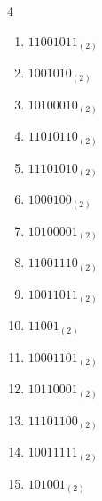 \begin{multicols}{4}
\begin{enumerate}
        \phantom{$=18$}

  \item $11001011_{(2)}$

        \phantom{$=203$}

\columnbreak %

  \item $1001010_{(2)}$

        \phantom{$=74$}

  \item $10100010_{(2)}$

        \phantom{$=162$}

  \item $11010110_{(2)}$

        \phantom{$=214$}

  \item $11101010_{(2)}$

        \phantom{$=234$}

  \item $1000100_{(2)}$

        \phantom{$=68$}

  \item $10100001_{(2)}$

        \phantom{$=161$}

  \item $11001110_{(2)}$

        \phantom{$=206$}

  \item $10011011_{(2)}$

        \phantom{$=155$}

  \item $11001_{(2)}$

        \phantom{$=25$}

  \item $10001101_{(2)}$

        \phantom{$=141$}

  \item $10110001_{(2)}$

        \phantom{$=177$}

  \item $11101100_{(2)}$

        \phantom{$=236$}

  \item $10011111_{(2)}$

        \phantom{$=159$}

  \item $101001_{(2)}$


\end{enumerate}
\end{multicols}
